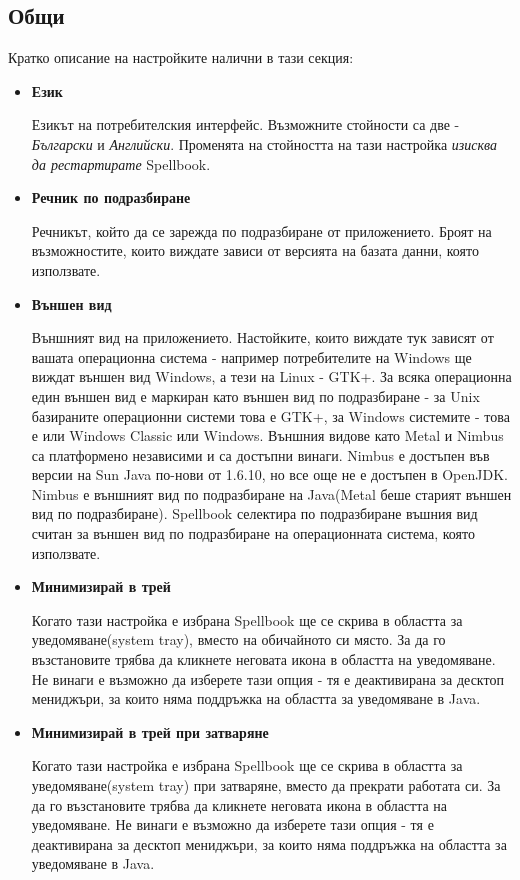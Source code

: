 \subsection{Общи}
Кратко описание на настройките налични в тази секция:
\begin{itemize}
  \item \textbf{Език}

    Езикът на потребителския интерфейс. Възможните стойности са две -
    \emph{Български} и \emph{Английски}. Променята на стойността на тази настройка
    \emph{изисква да рестартирате} Spellbook. 
  \item \textbf{Речник по подразбиране}

    Речникът, който да се зарежда по подразбиране от
    приложението. Броят на възможностите, които виждате зависи от
    версията на базата данни, която използвате.
  \item \textbf{Външен вид}

    Външният вид на приложението. Настойките, които виждате тук
    зависят от вашата операционна система - например потребителите на
    Windows ще виждат външен вид Windows, а тези на Linux - GTK+. За
    всяка операционна един външен вид е маркиран като външен вид по
    подразбиране - за Unix базираните операционни системи това е GTK+,
    за Windows системите - това е или Windows Classic или Windows. 
    Външния видове като Metal и Nimbus са платформено независими и са
    достъпни винаги. Nimbus е достъпен във версии на Sun Java по-нови
    от 1.6.10, но все още не е достъпен в OpenJDK. Nimbus е външният
    вид по подразбиране на Java(Metal беше старият външен вид по
    подразбиране). Spellbook селектира по подразбиране въшния вид
    считан за външен вид по подразбиране на операционната система,
    която използвате. 
  \item \textbf{Минимизирай в трей}
    
    Когато тази настройка е избрана Spellbook ще се скрива в областта
    за уведомяване(system tray), вместо на обичайното си място. За да
    го възстановите трябва да кликнете неговата икона в областта на
    уведомяване. Не винаги е възможно да изберете тази опция - тя е
    деактивирана за десктоп мениджъри, за които няма поддръжка на
    областта за уведомяване в Java.
  \item \textbf{Минимизирай в трей при затваряне} 

    Когато тази настройка е избрана Spellbook ще се скрива в областта
    за уведомяване(system tray) при затваряне, вместо да прекрати
    работата си. За да го възстановите трябва да кликнете неговата
    икона в областта на уведомяване. Не винаги е възможно да изберете
    тази опция - тя е деактивирана за десктоп мениджъри, за които няма
    поддръжка на областта за уведомяване в Java.


\end{itemize}
